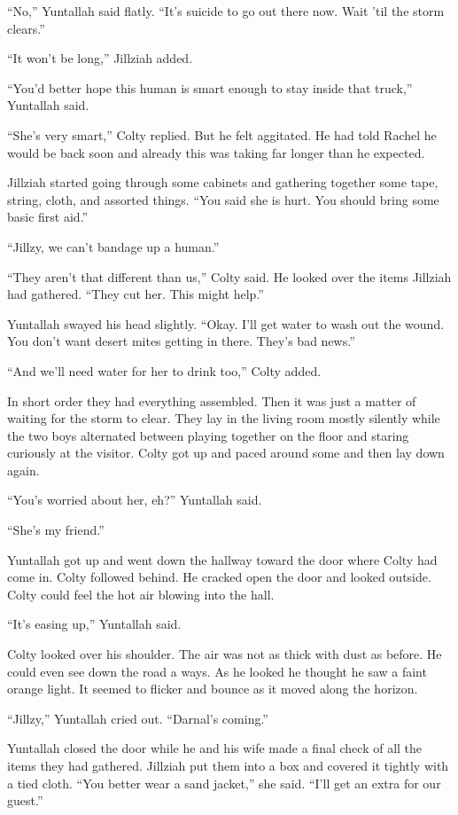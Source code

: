 ``No,'' Yuntallah said flatly. ``It's suicide to go out there now. Wait 'til the storm clears.''

``It won't be long,'' Jillziah added.

``You'd better hope this human is smart enough to stay inside that truck,'' Yuntallah said.

``She's very smart,'' Colty replied. But he felt aggitated. He had told Rachel he would be back
soon and already this was taking far longer than he expected.

Jillziah started going through some cabinets and gathering together some tape, string, cloth,
and assorted things. ``You said she is hurt. You should bring some basic first aid.''

``Jillzy, we can't bandage up a human.''

``They aren't that different than us,'' Colty said. He looked over the items Jillziah had
gathered. ``They cut her. This might help.''

Yuntallah swayed his head slightly. ``Okay. I'll get water to wash out the wound. You don't want
desert mites getting in there. They's bad news.''

``And we'll need water for her to drink too,'' Colty added.

In short order they had everything assembled. Then it was just a matter of waiting for the storm
to clear. They lay in the living room mostly silently while the two boys alternated between
playing together on the floor and staring curiously at the visitor. Colty got up and paced
around some and then lay down again.

``You's worried about her, eh?'' Yuntallah said.

``She's my friend.''

Yuntallah got up and went down the hallway toward the door where Colty had come in. Colty
followed behind. He cracked open the door and looked outside. Colty could feel the hot air
blowing into the hall.

``It's easing up,'' Yuntallah said.

Colty looked over his shoulder. The air was not as thick with dust as before. He could even see
down the road a ways. As he looked he thought he saw a faint orange light. It seemed to flicker
and bounce as it moved along the horizon.

``Jillzy,'' Yuntallah cried out. ``Darnal's coming.''

Yuntallah closed the door while he and his wife made a final check of all the items they had
gathered. Jillziah put them into a box and covered it tightly with a tied cloth. ``You better
wear a sand jacket,'' she said. ``I'll get an extra for our guest.''

